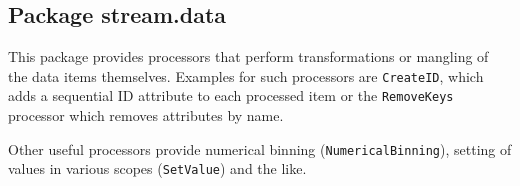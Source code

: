 \subsection{Package stream.data}

This package provides processors that perform transformations or
mangling of the data items themselves. Examples for such processors are
\texttt{CreateID}, which adds a sequential ID attribute to each
processed item or the \texttt{RemoveKeys} processor which removes
attributes by name.

Other useful processors provide numerical binning
(\texttt{NumericalBinning}), setting of values in various scopes
(\texttt{SetValue}) and the like.




















